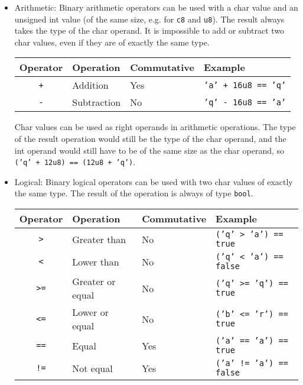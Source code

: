 \begin{itemize}
\item Arithmetic: Binary arithmetic operators can be used with a char value and
  an unsigned int value (of the same size, e.g. for \texttt{c8} and
  \texttt{u8}). The result always takes the type of the char operand. It is
  impossible to add or subtract two char values, even if they are of exactly the
  same type.

  \begin{center}
    \vspace{-5pt}\begin{adjustbox}{max width=1.0\linewidth}
      \begin{tabular}{|c|lll|}
        \hline
        Operator & Operation & Commutative & Example\\[0pt]
        \hline
        \hline
        \texttt{+} & Addition & Yes & \texttt{'a' + 16u8 == 'q'}\\[0pt]
        \texttt{-} & Subtraction & No & \texttt{'q' - 16u8 == 'a'}\\[0pt]
        \hline
      \end{tabular}
  \end{adjustbox}\end{center}


  Char values can be used as right operands in arithmetic operations. The type of
  the result operation would still be the type of the char operand, and the int
  operand would still have to be of the same size as the char operand, so
  \texttt{('q' + 12u8) == (12u8 + 'q')}.

\item Logical: Binary logical operators can be used with two char values of
  exactly the same type. The result of the operation is always of type
  \texttt{bool}.

  \begin{center}
    \vspace{-10pt}\begin{adjustbox}{max width=1.0\linewidth}
      \begin{tabular}{|c|lll|}
        \hline
        Operator & Operation & Commutative & Example\\[0pt]
        \hline
        \hline
        \texttt{>} & Greater than & No & \texttt{('q' > 'a') == true}\\[0pt]
        \texttt{<} & Lower than & No & \texttt{('q' < 'a') == false}\\[0pt]
        \texttt{>=} & Greater or equal & No & \texttt{('q' >= 'q') == true}\\[0pt]
        \texttt{<=} & Lower or equal & No & \texttt{('b' <= 'r') == true}\\[0pt]
        \texttt{==} & Equal & Yes & \texttt{('a' == 'a') == true}\\[0pt]
        \texttt{!=} & Not equal & Yes & \texttt{('a' != 'a') == false}\\[0pt]
        \hline
      \end{tabular}
  \end{adjustbox}\end{center}


\end{itemize}
